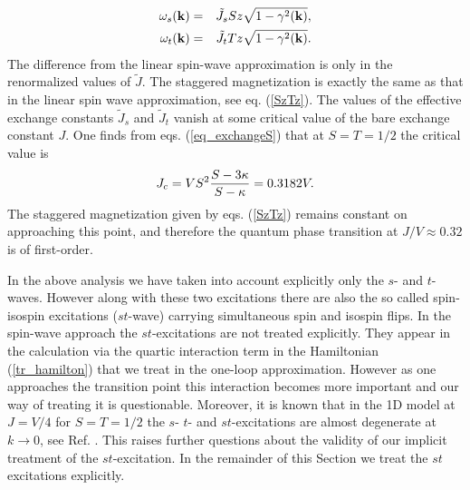 \begin{eqnarray}
\label{exit}
\omega_s({\bf k})& =& {\tilde J_s}Sz 
\sqrt{ 1 - \gamma^2({\bf k}) }, \\
\omega_t({\bf k})& =& {\tilde J_t}T z 
\sqrt{ 1 - \gamma^2({\bf k}) }. \nonumber
\end{eqnarray}
The difference from the linear spin-wave approximation is only
in the renormalized values of $\tilde{J}$.
The staggered magnetization is exactly the same as that in the
linear spin wave approximation, see eq. (\ref{SzTz}).
The  values of the effective exchange constants $\tilde{J}_s$ and
$\tilde{J}_t$ vanish at some critical value of the bare exchange 
constant $J$. One finds from  eqs. (\ref{eq_exchangeS}) that
at $S=T=1/2$ the critical value is
\begin{equation}
J_c = VS^2
{    {S-3\kappa}   \over   {S-\kappa}  } =0.3182V .
\end{equation}
The staggered magnetization given by eqs. (\ref{SzTz}) remains constant
on approaching this point, and therefore the quantum
phase transition at $J/V\approx 0.32$ is of first-order.

In the above analysis  we have taken into account explicitly only the $s$- 
and $t$-waves. However along with these two excitations there are
also the so called spin-isospin excitations ($st$-wave) carrying 
simultaneous spin and isospin flips.
In the spin-wave approach the $st$-excitations are not treated 
explicitly. They appear in the calculation via the quartic
interaction term in the Hamiltonian (\ref{tr_hamilton}) that
we treat in the one-loop approximation.
However as one approaches the transition point this interaction  
becomes more important and our way of treating it is questionable.
Moreover, it is known that in the 1D  model at $J=V/4$ for $S=T=1/2$ 
the $s$- $t$- and $st$-excitations are almost degenerate at $k \to 0$,
see Ref. \cite{exact1d}. This raises further questions about the validity
of our implicit treatment of the $st$-excitation. In the remainder of
this Section we treat the $st$ excitations explicitly.

